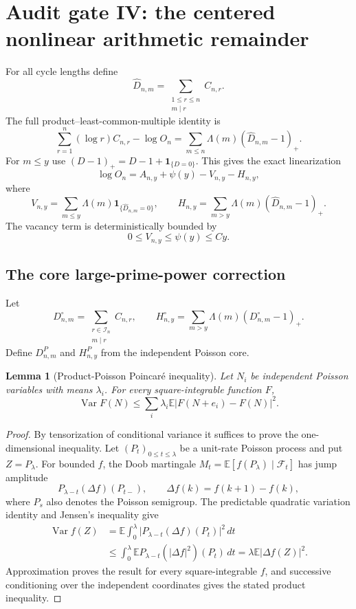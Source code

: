 \documentclass[11pt]{article}
\newtheorem{lemma}[theorem]{Lemma}
\theoremstyle{remark}
\newcommand{\Ee}{\mathbb E}
\newcommand{\Var}{\operatorname{Var}}
\newcommand{\one}{\mathbf 1}
\newcommand{\dd}{\,d}
\begin{document}
\section{Audit gate IV: the centered nonlinear arithmetic remainder}
\label{sec:remainder-gate}

For all cycle lengths define
\[
 \widehat D_{n,m}=\sum_{\substack{1\le r\le n\\m\mid r}}C_{n,r}.
\]
The full product--least-common-multiple identity is
\[
 \sum_{r=1}^n(\log r)C_{n,r}-\log O_n
 =\sum_{m\le n}\Lambda(m)(\widehat D_{n,m}-1)_+.
\]
For $m\le y$ use
$(D-1)_+=D-1+\one_{\{D=0\}}$.  This gives the exact linearization
\begin{equation}
\label{eq:exact-linearization}
 \log O_n=A_{n,y}+\psi(y)-V_{n,y}-H_{n,y},
\end{equation}
where
\[
 V_{n,y}=\sum_{m\le y}\Lambda(m)\one_{\{\widehat D_{n,m}=0\}},
 \qquad
 H_{n,y}=\sum_{m>y}\Lambda(m)(\widehat D_{n,m}-1)_+.
\]
The vacancy term is deterministically bounded by
\begin{equation}
\label{eq:vacancy-bound}
 0\le V_{n,y}\le\psi(y)\le Cy.
\end{equation}

\subsection{The core large-prime-power correction}

Let
\[
 D_{n,m}^\circ=\sum_{\substack{r\in\mathcal I_n\\m\mid r}}C_{n,r},
 \qquad
 H_{n,y}^\circ=\sum_{m>y}\Lambda(m)(D_{n,m}^\circ-1)_+.
\]
Define $D_{n,m}^P$ and $H_{n,y}^P$ from the independent Poisson core.

\begin{lemma}[Product-Poisson Poincar\'e inequality]
\label{lem:product-poisson-poincare}
Let $N_i$ be independent Poisson variables with means $\lambda_i$.  For
every square-integrable function $F$,
\[
 \Var F(N)\le\sum_i\lambda_i\Ee
 \bigl|F(N+e_i)-F(N)\bigr|^2.
\]
\end{lemma}

\begin{proof}
By tensorization of conditional variance it suffices to prove the
one-dimensional inequality.  Let $(P_t)_{0\le t\le\lambda}$ be a unit-rate
Poisson process and put $Z=P_\lambda$.  For bounded $f$, the Doob martingale
$M_t=\Ee[f(P_\lambda)\mid\mathcal F_t]$ has jump amplitude
\[
 P_{\lambda-t}(\Delta f)(P_{t-}),
 \qquad \Delta f(k)=f(k+1)-f(k),
\]
where $P_s$ also denotes the Poisson semigroup.  The predictable quadratic
variation identity and Jensen's inequality give
\begin{align*}
 \Var f(Z)
 &=\Ee\int_0^\lambda
   \bigl|P_{\lambda-t}(\Delta f)(P_t)\bigr|^2\dd t\\
 &\le\int_0^\lambda
   \Ee P_{\lambda-t}(|\Delta f|^2)(P_t)\dd t
 =\lambda\Ee|\Delta f(Z)|^2.
\end{align*}
Approximation proves the result for every square-integrable $f$, and
successive conditioning over the independent coordinates gives the stated
product inequality.
\end{proof}
\end{document}
